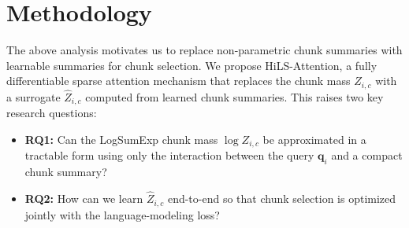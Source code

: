 \section{Methodology}\label{sec:method}

The above analysis motivates us to replace non-parametric chunk summaries with learnable summaries for chunk selection. 
We propose HiLS-Attention, a fully differentiable sparse attention mechanism that replaces the chunk mass $Z_{i,c}$ with a surrogate $\hat{Z}_{i,c}$ computed from learned chunk summaries.
This raises two key research questions:
\begin{research_question}{}{}
\begin{itemize}[leftmargin=*,itemsep=0.2em,topsep=0.3em]
    \item \textbf{RQ1:} Can the LogSumExp chunk mass $\log Z_{i,c}$ be approximated in a tractable form using only the interaction between the query $\mathbf{q}_i$ and a compact chunk summary?
    \item \textbf{RQ2:} How can we learn $\hat{Z}_{i,c}$ end-to-end so that chunk selection is optimized jointly with the language-modeling loss?
\end{itemize}
\end{research_question}
